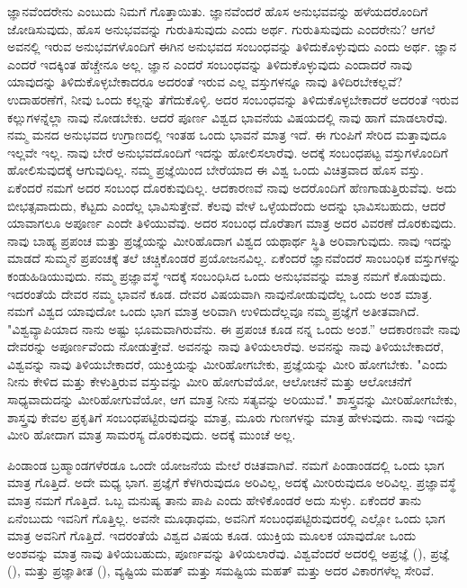 ಜ್ಞಾನವೆಂದರೇನು ಎಂಬುದು ನಿಮಗೆ ಗೊತ್ತಾಯಿತು. ಜ್ಞಾನವೆಂದರೆ ಹೊಸ ಅನುಭವವನ್ನು ಹಳೆಯದರೊಂದಿಗೆ ಜೋಡಿಸುವುದು, ಹೊಸ ಅನುಭವವನ್ನು ಗುರುತಿಸುವುದು ಎಂದು ಅರ್ಥ. ಗುರುತಿಸುವುದು ಎಂದರೇನು? ಆಗಲೆ ಅವನಲ್ಲಿ ಇರುವ ಅನುಭವಗಳೊಂದಿಗೆ ಈಗಿನ ಅನುಭವದ ಸಂಬಂಧವನ್ನು ತಿಳಿದುಕೊಳ್ಳುವುದು ಎಂದು ಅರ್ಥ. ಜ್ಞಾನ ಎಂದರೆ ಇದಕ್ಕಿಂತ ಹೆಚ್ಚೇನೂ ಅಲ್ಲ. ಜ್ಞಾನ ಎಂದರೆ ಸಂಬಂಧವನ್ನು ತಿಳಿದುಕೊಳ್ಳುವುದು ಎಂದಾದರೆ ನಾವು ಯಾವುದನ್ನು ತಿಳಿದುಕೊಳ್ಳಬೇಕಾದರೂ ಅದರಂತೆ ಇರುವ ಎಲ್ಲ ವಸ್ತುಗಳನ್ನೂ ನಾವು ತಿಳಿದಿರಬೇಕಲ್ಲವೆ? ಉದಾಹರಣೆಗೆ, ನೀವು ಒಂದು ಕಲ್ಲನ್ನು ತೆಗೆದುಕೊಳ್ಳಿ. ಅದರ ಸಂಬಂಧವನ್ನು ತಿಳಿದುಕೊಳ್ಳಬೇಕಾದರೆ ಅದರಂತೆ ಇರುವ ಕಲ್ಲುಗಳನ್ನೆಲ್ಲಾ ನಾವು ನೋಡಬೇಕು. ಆದರೆ ಪೂರ್ಣ ವಿಶ್ವದ ಭಾವನೆಯ ವಿಷಯದಲ್ಲಿ ನಾವು ಹಾಗೆ ಮಾಡಲಾರೆವು. ನಮ್ಮ ಮನದ ಅನುಭವದ ಉಗ್ರಾಣದಲ್ಲಿ ಇಂತಹ ಒಂದು ಭಾವನೆ ಮಾತ್ರ ಇದೆ. ಈ ಗುಂಪಿಗೆ ಸೇರಿದ ಮತ್ತಾವುದೂ ಇಲ್ಲವೇ ಇಲ್ಲ. ನಾವು ಬೇರೆ ಅನುಭವದೊಂದಿಗೆ ಇದನ್ನು ಹೋಲಿಸಲಾರೆವು. ಅದಕ್ಕೆ ಸಂಬಂಧಪಟ್ಟ ವಸ್ತುಗಳೊಂದಿಗೆ ಹೋಲಿಸುವುದಕ್ಕೆ ಆಗುವುದಿಲ್ಲ. ನಮ್ಮ ಪ್ರಜ್ಞೆಯಿಂದ ಬೇರೆಯಾದ ಈ ವಿಶ್ವ ಒಂದು ವಿಚಿತ್ರವಾದ ಹೊಸ ವಸ್ತು. ಏಕೆಂದರೆ ನಮಗೆ ಅದರ ಸಂಬಂಧ ದೊರಕುವುದಿಲ್ಲ. ಆದಕಾರಣವೆ ನಾವು ಅದರೊಂದಿಗೆ ಹೆಣಗಾಡುತ್ತಿರುವೆವು. ಅದು ಬೀಭತ್ಸವಾದುದು, ಕೆಟ್ಟದು ಎಂದೆಲ್ಲ ಭಾವಿಸುತ್ತೇವೆ. ಕೆಲವು ವೇಳೆ ಒಳ್ಳೆಯದೆಂದು ಅದನ್ನು ಭಾವಿಸಬಹುದು, ಆದರೆ ಯಾವಾಗಲೂ ಅಪೂರ್ಣ ಎಂದೇ ತಿಳಿಯುವೆವು. ಅದರ ಸಂಬಂಧ ದೊರೆತಾಗ ಮಾತ್ರ ಅದರ ವಿವರಣೆ ದೊರಕುವುದು. ನಾವು ಬಾಹ್ಯ ಪ್ರಪಂಚ ಮತ್ತು ಪ್ರಜ್ಞೆಯನ್ನು ಮೀರಿಹೊದಾಗ ವಿಶ್ವದ ಯಥಾರ್ಥ ಸ್ಥಿತಿ ಅರಿವಾಗುವುದು. ನಾವು ಇದನ್ನು ಮಾಡದೆ ಸುಮ್ಮನೆ ಪ್ರಪಂಚಕ್ಕೆ ತಲೆ ಚಚ್ಚಿಕೊಂಡರೆ ಪ್ರಯೋಜನವಿಲ್ಲ. ಏಕೆಂದರೆ ಜ್ಞಾನವೆಂದರೆ ಸಾಂಬಂಧಿಕ ವಸ್ತುಗಳನ್ನು ಕಂಡುಹಿಡಿಯುವುದು. ನಮ್ಮ ಪ್ರಜ್ಞಾವಸ್ಥೆ ಇದಕ್ಕೆ ಸಂಬಂಧಿಸಿದ ಒಂದು ಅನುಭವವನ್ನು ಮಾತ್ರ ನಮಗೆ ಕೊಡುವುದು. ಇದರಂತೆಯೆ ದೇವರ ನಮ್ಮ ಭಾವನೆ ಕೂಡ. ದೇವರ ವಿಷಯವಾಗಿ ನಾವು\break ನೋಡುವುದೆಲ್ಲ ಒಂದು ಅಂಶ ಮಾತ್ರ. ನಮಗೆ ವಿಶ್ವದ ಯಾವುದೋ ಒಂದು ಭಾಗ ಮಾತ್ರ ಅರಿವಾಗಿ ಉಳಿದುದೆಲ್ಲವೂ ನಮ್ಮ ಪ್ರಜ್ಞೆಗೆ ಅತೀತವಾಗಿದೆ. "ವಿಶ್ವವ್ಯಾಪಿಯಾದ ನಾನು ಅಷ್ಟು ಭೂಮವಾಗಿರುವೆನು. ಈ ಪ್ರಪಂಚ ಕೂಡ ನನ್ನ ಒಂದು ಅಂಶ.'' ಆದಕಾರಣವೇ ನಾವು ದೇವರನ್ನು ಅಪೂರ್ಣವೆಂದು ನೋಡುತ್ತೇವೆ. ಅವನನ್ನು ನಾವು ತಿಳಿಯಲಾರೆವು. ಅವನನ್ನು ನಾವು ತಿಳಿಯಬೇಕಾದರೆ, ವಿಶ್ವವನ್ನು ನಾವು ತಿಳಿಯಬೇಕಾದರೆ, ಯುಕ್ತಿಯನ್ನು ಮೀರಿಹೋಗಬೇಕು, ಪ್ರಜ್ಞೆಯನ್ನು ಮೀರಿ ಹೋಗಬೇಕು. "ಎಂದು ನೀನು ಕೇಳಿದ ಮತ್ತು ಕೇಳುತ್ತಿರುವ ವಸ್ತುವನ್ನು ಮೀರಿ ಹೋಗುವೆಯೋ, ಆಲೋಚನೆ ಮತ್ತು ಆಲೋಚನೆಗೆ ಸಾಧ್ಯವಾದುದನ್ನು ಮೀರಿಹೋಗುವೆಯೋ, ಆಗ ಮಾತ್ರ ನೀನು ಸತ್ಯವನ್ನು ಅರಿಯುವೆ." ಶಾಸ್ತ್ರವನ್ನು ಮೀರಿಹೋಗಬೇಕು, ಶಾಸ್ತ್ರವು ಕೇವಲ ಪ್ರಕೃತಿಗೆ ಸಂಬಂಧಪಟ್ಟಿರುವುದನ್ನು ಮಾತ್ರ, ಮೂರು ಗುಣಗಳನ್ನು ಮಾತ್ರ ಹೇಳುವುದು. ನಾವು ಇದನ್ನು ಮೀರಿ ಹೋದಾಗ ಮಾತ್ರ ಸಾಮರಸ್ಯ ದೊರಕುವುದು. ಅದಕ್ಕೆ ಮುಂಚೆ ಅಲ್ಲ.

ಪಿಂಡಾಂಡ ಬ್ರಹ್ಮಾಂಡಗಳೆರಡೂ ಒಂದೇ ಯೋಜನೆಯ ಮೇಲೆ ರಚಿತವಾಗಿವೆ. ನಮಗೆ ಪಿಂಡಾಂಡದಲ್ಲಿ ಒಂದು ಭಾಗ ಮಾತ್ರ ಗೊತ್ತಿದೆ. ಅದೇ ಮಧ್ಯ ಭಾಗ. ಪ್ರಜ್ಞೆಗೆ ಕೆಳಗಿರುವುದೂ ಅರಿವಿಲ್ಲ, ಅದಕ್ಕೆ ಮೀರಿರುವುದೂ ಅರಿವಿಲ್ಲ. ಪ್ರಜ್ಞಾವಸ್ಥೆ ಮಾತ್ರ ನಮಗೆ ಗೊತ್ತಿದೆ. ಒಬ್ಬ ಮನುಷ್ಯ ತಾನು ಪಾಪಿ ಎಂದು ಹೇಳಿಕೊಂಡರೆ ಅದು ಸುಳ್ಳು. ಏಕೆಂದರೆ ತಾನು ಏನೆಂಬುದು ಇವನಿಗೆ ಗೊತ್ತಿಲ್ಲ. ಅವನೇ ಮೂಢಾಧಮ, ಅವನಿಗೆ ಸಂಬಂಧಪಟ್ಟಿರುವುದರಲ್ಲಿ ಎಲ್ಲೋ ಒಂದು ಭಾಗ ಮಾತ್ರ ಅವನಿಗೆ ಗೊತ್ತಿದೆ. ಇದರಂತೆಯೆ ವಿಶ್ವದ ವಿಷಯ ಕೂಡ. ಯುಕ್ತಿಯ ಮೂಲಕ ಯಾವುದೋ ಒಂದು ಅಂಶವನ್ನು ಮಾತ್ರ ನಾವು ತಿಳಿಯಬಹುದು, ಪೂರ್ಣವನ್ನು ತಿಳಿಯಲಾರೆವು. ವಿಶ್ವವೆಂದರೆ ಅದರಲ್ಲಿ ಅಪ್ರಜ್ಞೆ (), ಪ್ರಜ್ಞೆ (), ಮತ್ತು ಪ್ರಜ್ಞಾತೀತ (), ವ್ಯಷ್ಟಿಯ ಮಹತ್ ಮತ್ತು ಸಮಷ್ಟಿಯ ಮಹತ್ ಮತ್ತು ಅದರ ವಿಕಾರಗಳೆಲ್ಲ ಸೇರಿವೆ.

